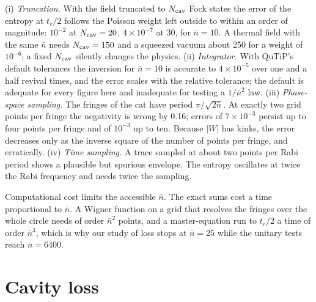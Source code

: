 \documentclass{iopjournal}
\newcommand{\nbar}{\bar{n}}
\begin{document}
(i) \emph{Truncation.} With the field truncated to $N_{\rm cav}$ Fock states the error of the entropy at $t_r/2$ follows the Poisson weight left outside to within an order of magnitude: $10^{-2}$ at $N_{\rm cav} = 20$, $4\times10^{-7}$ at 30, for $\nbar = 10$. A thermal field with the same $\nbar$ needs $N_{\rm cav} = 150$ and a squeezed vacuum about 250 for a weight of $10^{-6}$; a fixed $N_{\rm cav}$ silently changes the physics.
(ii) \emph{Integrator.} With QuTiP's default tolerances the inversion for $\nbar = 10$ is accurate to $4\times10^{-5}$ over one and a half revival times, and the error scales with the relative tolerance; the default is adequate for every figure here and inadequate for testing a $1/\nbar^2$ law.
(iii) \emph{Phase-space sampling.} The fringes of the cat have period $\pi/\sqrt{2\nbar}$. At exactly two grid points per fringe the negativity is wrong by 0.16; errors of $7\times10^{-3}$ persist up to four points per fringe and of $10^{-3}$ up to ten. Because $|W|$ has kinks, the error decreases only as the inverse square of the number of points per fringe, and erratically.
(iv) \emph{Time sampling.} A trace sampled at about two points per Rabi period shows a plausible but spurious envelope. The entropy oscillates at twice the Rabi frequency and needs twice the sampling.

Computational cost limits the accessible $\nbar$. The exact sums cost a time proportional to $\nbar$. A Wigner function on a grid that resolves the fringes over the whole circle needs of order $\nbar^2$ points, and a master-equation run to $t_r/2$ a time of order $\nbar^{3}$, which is why our study of loss stops at $\nbar = 25$ while the unitary tests reach $\nbar = 6400$.

\section{Cavity loss}
\label{sec:loss}
\end{document}
